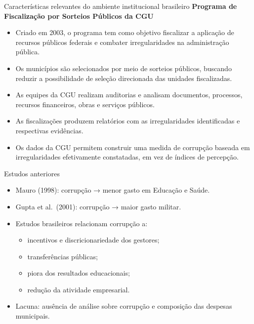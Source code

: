 \documentclass[
  10pt,
  ignorenonframetext,
  aspectratio=169,
  brazilian,
]{beamer}
\providecommand{\tightlist}{%
  \setlength{\itemsep}{0pt}\setlength{\parskip}{0pt}}
\begin{document}
\begin{frame}{Características relevantes do ambiente institucional
brasileiro}
\protect{}\label{caracteruxedsticas-relevantes-do-ambiente-institucional-brasileiro-1}
\textbf{Programa de Fiscalização por Sorteios Públicos da CGU}

\begin{itemize}
\item
  Criado em 2003, o programa tem como objetivo fiscalizar a aplicação de
  recursos públicos federais e combater irregularidades na administração
  pública.
\item
  Os municípios são selecionados por meio de sorteios públicos, buscando
  reduzir a possibilidade de seleção direcionada das unidades
  fiscalizadas.
\item
  As equipes da CGU realizam auditorias e analisam documentos,
  processos, recursos financeiros, obras e serviços públicos.
\item
  As fiscalizações produzem relatórios com as irregularidades
  identificadas e respectivas evidências.
\item
  Os dados da CGU permitem construir uma medida de corrupção baseada em
  irregularidades efetivamente constatadas, em vez de índices de
  percepção.
\end{itemize}
\end{frame}

\begin{frame}{Estudos anteriores}
\protect{}\label{estudos-anteriores}
\begin{itemize}
\item
  Mauro (1998): corrupção → menor gasto em Educação e Saúde.
\item
  Gupta et al.~(2001): corrupção → maior gasto militar.
\item
  Estudos brasileiros relacionam corrupção a:

  \begin{itemize}
  \tightlist
  \item
    incentivos e discricionariedade dos gestores;
  \item
    transferências públicas;
  \item
    piora dos resultados educacionais;
  \item
    redução da atividade empresarial.
  \end{itemize}
\item
  Lacuna: ausência de análise sobre corrupção e composição das despesas
  municipais.
\end{itemize}
\end{frame}
\end{document}
